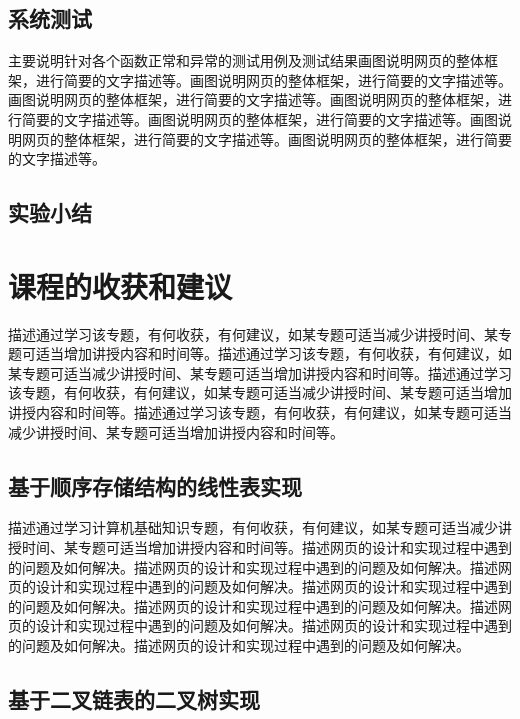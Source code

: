 \documentclass[supercite]{Experimental_Report}
\theoremstyle{definition}
\begin{document}
\subsection{系统测试}

主要说明针对各个函数正常和异常的测试用例及测试结果画图说明网页的整体框架，进行简要的文字描述等。画图说明网页的整体框架，进行简要的文字描述等。画图说明网页的整体框架，进行简要的文字描述等。画图说明网页的整体框架，进行简要的文字描述等。画图说明网页的整体框架，进行简要的文字描述等。画图说明网页的整体框架，进行简要的文字描述等。画图说明网页的整体框架，进行简要的文字描述等。

\subsection{实验小结}

\newpage

\section{课程的收获和建议}

描述通过学习该专题，有何收获，有何建议，如某专题可适当减少讲授时间、某专题可适当增加讲授内容和时间等。描述通过学习该专题，有何收获，有何建议，如某专题可适当减少讲授时间、某专题可适当增加讲授内容和时间等。描述通过学习该专题，有何收获，有何建议，如某专题可适当减少讲授时间、某专题可适当增加讲授内容和时间等。描述通过学习该专题，有何收获，有何建议，如某专题可适当减少讲授时间、某专题可适当增加讲授内容和时间等。

\subsection{基于顺序存储结构的线性表实现}

描述通过学习计算机基础知识专题，有何收获，有何建议，如某专题可适当减少讲授时间、某专题可适当增加讲授内容和时间等。描述网页的设计和实现过程中遇到的问题及如何解决。描述网页的设计和实现过程中遇到的问题及如何解决。描述网页的设计和实现过程中遇到的问题及如何解决。描述网页的设计和实现过程中遇到的问题及如何解决。描述网页的设计和实现过程中遇到的问题及如何解决。描述网页的设计和实现过程中遇到的问题及如何解决。描述网页的设计和实现过程中遇到的问题及如何解决。描述网页的设计和实现过程中遇到的问题及如何解决。

\subsection{基于二叉链表的二叉树实现}
\end{document}
